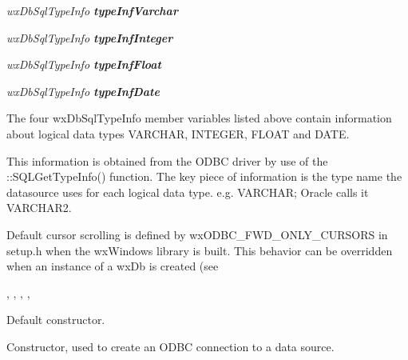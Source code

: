 


{\it wxDbSqlTypeInfo {\bf typeInfVarchar}}

{\it wxDbSqlTypeInfo {\bf typeInfInteger}}

{\it wxDbSqlTypeInfo {\bf typeInfFloat}}

{\it wxDbSqlTypeInfo {\bf typeInfDate}}

\begin{indented}{1cm}
The four wxDbSqlTypeInfo member variables listed above contain information about logical data types VARCHAR, INTEGER, FLOAT and DATE.

This information is obtained from the ODBC driver by use of the ::SQLGetTypeInfo() function.  The key piece of information is the type name the datasource uses for each logical data type. e.g. VARCHAR; Oracle calls it VARCHAR2.
\end{indented}


Default cursor scrolling is defined by wxODBC_FWD_ONLY_CURSORS in setup.h
when the wxWindows library is built.  This behavior can be overridden when 
an instance of a wxDb is created (see 


, , , , 



\label{wxdbconstr}


Default constructor.


Constructor, used to create an ODBC connection to a data source.

